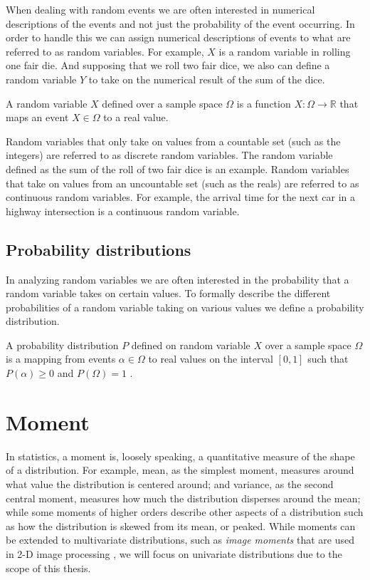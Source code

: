 When dealing with random events we are often interested in numerical descriptions of the events and not just the probability of the event occurring. In order to handle this we can assign numerical descriptions of events to what are referred to as random variables. For example, $ X $ is a random variable in rolling one fair die. And supposing that we roll two fair dice, we also can define a random variable $ Y $  to take on the numerical result of the sum of the dice. 

\begin{defn}
A random variable $ X $  defined over a sample space $ \Omega $  is a function $ X: \Omega \rightarrow \mathbb{R} $ that maps an event $ X \in \Omega $  to a real value.
\end{defn}

Random variables that only take on values from a countable set (such as the integers) are referred to as discrete random variables. The random variable defined as the sum of the roll of two fair dice is an example. Random variables that take on values from an uncountable set (such as the reals) are referred to as continuous random variables. For example, the arrival time for the next car in a highway intersection is a continuous random variable.

\subsection{Probability distributions}
In analyzing random variables we are often interested in the probability that a random variable takes on certain values. To formally describe the different probabilities of a random variable taking on various values we define a probability distribution.

\begin{defn}
A probability distribution $ P $ defined on random variable $ X $  over a sample space $ \Omega $  is a mapping from events $ \alpha \in \Omega $  to real values on the interval $ [0,1] $  such that $ P(\alpha) \geq 0 $  and $ P(\Omega)=1 $ .
\end{defn}


\section{Moment}
In statistics, a moment is, loosely speaking, a quantitative measure of the shape of a distribution. For example, mean, as the simplest moment, measures around what value the distribution is centered around; and variance, as the second central moment, measures how much the distribution disperses around the mean; while some moments of higher orders describe other aspects of a distribution such as how the distribution is skewed from its mean, or peaked. While moments can be extended to multivariate distributions, such as \textit{image moments} that are used in 2-D image processing \cite{hu1962visual}, we will focus on univariate distributions due to the scope of this thesis. 


